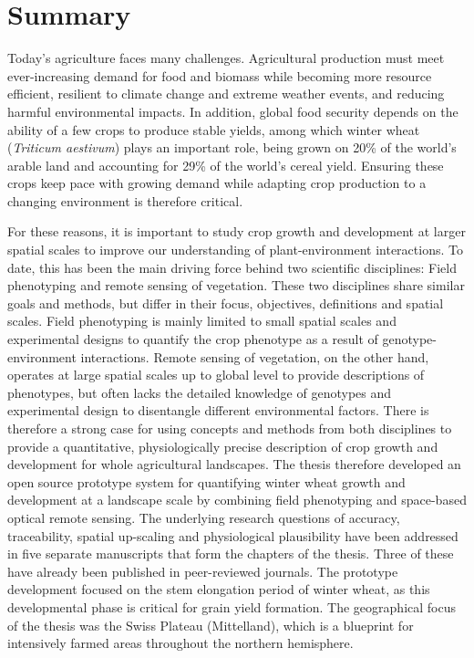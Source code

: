 \chapter*{Summary}

Today's agriculture faces many challenges. Agricultural production must meet ever-increasing demand for food and biomass while becoming more resource efficient, resilient to climate change and extreme weather events, and reducing harmful environmental impacts. In addition, global food security depends on the ability of a few crops to produce stable yields, among which winter wheat (\textsl{Triticum aestivum}) plays an important role, being grown on 20\% of the world's arable land and accounting for 29\% of the world's cereal yield. Ensuring these crops keep pace with growing demand while adapting crop production to a changing environment is therefore critical.

For these reasons, it is important to study crop growth and development at larger spatial scales to improve our understanding of plant-environment interactions. To date, this has been the main driving force behind two scientific disciplines: Field phenotyping and remote sensing of vegetation. These two disciplines share similar goals and methods, but differ in their focus, objectives, definitions and spatial scales. Field phenotyping is mainly limited to small spatial scales and experimental designs to quantify the crop phenotype as a result of genotype-environment interactions. Remote sensing of vegetation, on the other hand, operates at large spatial scales up to global level to provide descriptions of phenotypes, but often lacks the detailed knowledge of genotypes and experimental design to disentangle different environmental factors. There is therefore a strong case for using concepts and methods from both disciplines to provide a quantitative, physiologically precise description of crop growth and development for whole agricultural landscapes.
The thesis therefore developed an open source prototype system for quantifying winter wheat growth and development at a landscape scale by combining field phenotyping and space-based optical remote sensing. The underlying research questions of accuracy, traceability, spatial up-scaling and physiological plausibility have been addressed in five separate manuscripts that form the chapters of the thesis. Three of these have already been published in peer-reviewed journals. The prototype development focused on the stem elongation period of winter wheat, as this developmental phase is critical for grain yield formation. The geographical focus of the thesis was the Swiss Plateau (Mittelland), which is a blueprint for intensively farmed areas throughout the northern hemisphere.

